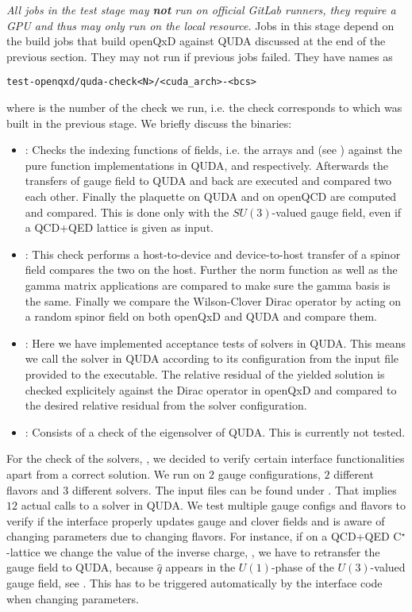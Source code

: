 \emph{All jobs in the test stage may \textbf{not} run on official GitLab runners, they require a GPU and thus may only run on the local resource.} Jobs in this stage depend on the build jobs that build openQxD against QUDA discussed at the end of the previous section. They may not run if previous jobs failed. They have names as
\begin{verbatim}
test-openqxd/quda-check<N>/<cuda_arch>-<bcs>
\end{verbatim}
where  is the number of the check we run, i.e. the check corresponds to  which was built in the previous stage. We briefly discuss the binaries:
\begin{itemize}
  \item {}: Checks the indexing functions of fields, i.e. the arrays  and  (see ) against the pure function implementations in QUDA,  and  respectively. Afterwards the transfers of gauge field to QUDA and back are executed and compared two each other. Finally the plaquette on QUDA and on openQCD are computed and compared. This is done only with the $SU(3)$-valued gauge field, even if a QCD+QED lattice is given as input.
  \item {}: This check performs a host-to-device and device-to-host transfer of a spinor field compares the two on the host. Further the norm function as well as the gamma matrix applications are compared to make sure the gamma basis is the same. Finally we compare the Wilson-Clover Dirac operator by acting on a random spinor field on both openQxD and QUDA and compare them.
  \item {}: Here we have implemented acceptance tests of solvers in QUDA. This means we call the solver in QUDA according to its configuration from the input file provided to the executable. The relative residual of the yielded solution is checked explicitely against the Dirac operator in openQxD and compared to the desired relative residual from the solver configuration.
  \item {}: Consists of a check of the eigensolver of QUDA. This is currently not tested.
\end{itemize}

For the check of the solvers, , we decided to verify certain interface functionalities apart from a correct solution. We run on $2$ gauge configurations, $2$ different flavors and $3$ different solvers. The input files can be found under . That implies $12$ actual calls to a solver in QUDA. We test multiple gauge configs and flavors to verify if the interface properly updates gauge and clover fields and is aware of changing parameters due to changing flavors. For instance, if on a QCD+QED C$^{\star}$-lattice we change the value of the inverse charge, , we have to retransfer the gauge field to QUDA, because $\hat{q}$ appears in the $U(1)$-phase of the $U(3)$-valued gauge field, see . This has to be triggered automatically by the interface code when changing parameters.

